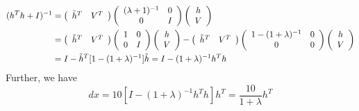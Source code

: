 \documentclass[]{article}
\begin{document}
\begin{equation}
  \begin{split}
  (h^Th+I)^{-1}&=\left( 
  \begin{array}[c]{cc}
    \tilde{h}^T&V^T
  \end{array}
  \right)\left( 
  \begin{array}[c]{cc}
    (\lambda+1)^{-1}&0\\
    0&I
  \end{array}
  \right)\left( 
  \begin{array}[c]{c}
    h\\
    V
  \end{array}
  \right)\\
  &=\left( 
  \begin{array}[c]{cc}
    \tilde{h}^T&V^T
  \end{array}
  \right)\left( 
  \begin{array}[c]{cc}
    1&0\\
    0&I
  \end{array}
  \right)\left( 
  \begin{array}[c]{c}
    h\\
    V
  \end{array}
  \right)
  -\left( 
  \begin{array}[c]{cc}
    \tilde{h}^T&V^T
  \end{array}
  \right)\left( 
  \begin{array}[c]{cc}
    1-(1+\lambda)^{-1}&0\\
    0&0
  \end{array}
  \right)\left( 
  \begin{array}[c]{c}
    h\\
    V
  \end{array}
  \right)\\
  &=I-\tilde{h}^T[1-(1+\lambda)^{-1}]\tilde{h}=I-(1+\lambda)^{-1}h^Th
  \end{split}
\end{equation}
Further, we have
\begin{equation}
  dx=10[I-(1+\lambda)^{-1}h^Th]h^T=\frac{10}{1+\lambda}h^T
\end{equation}
\end{document}
